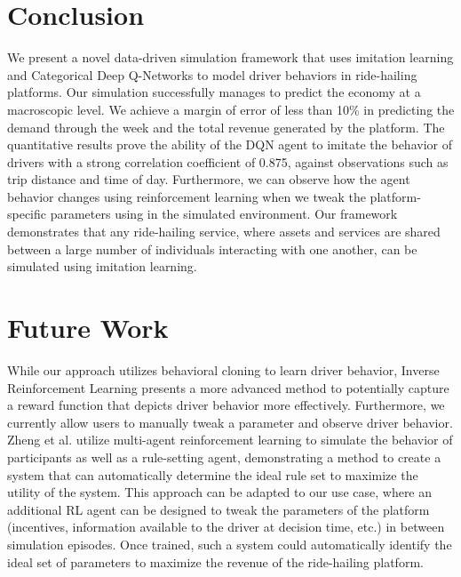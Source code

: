 \documentclass[runningheads]{llncs}
\begin{document}
\section {Conclusion}

We present a novel data-driven simulation framework that uses imitation learning and Categorical Deep Q-Networks to model driver behaviors in ride-hailing platforms. Our simulation successfully manages to predict the economy at a macroscopic level. We achieve a margin of error of less than 10\% in predicting the demand through the week and the total revenue generated by the platform. The quantitative results prove the ability of the DQN agent to imitate the behavior of drivers with a strong correlation coefficient of 0.875, against observations such as trip distance and time of day. Furthermore, we can observe how the agent behavior changes using reinforcement learning when we tweak the platform-specific parameters using in the simulated environment. Our framework demonstrates that any ride-hailing service, where assets and services are shared between a large number of individuals interacting with one another, can be simulated using imitation learning.

\section {Future Work} 

While our approach utilizes behavioral cloning to learn driver behavior, Inverse Reinforcement Learning presents a more advanced method to potentially capture a reward function that depicts driver behavior more effectively. Furthermore, we currently allow users to manually tweak a parameter and observe driver behavior. Zheng et al. \cite{zheng2020ai} utilize multi-agent reinforcement learning to simulate the behavior of participants as well as a rule-setting agent, demonstrating a method to create a system that can automatically determine the ideal rule set to maximize the utility of the system. This approach can be adapted to our use case, where an additional RL agent can be designed to tweak the parameters of the platform (incentives, information available to the driver at decision time, etc.) in between simulation episodes. Once trained, such a system could automatically identify the ideal set of parameters to maximize the revenue of the ride-hailing platform.

%
%
%


%
\end{document}
